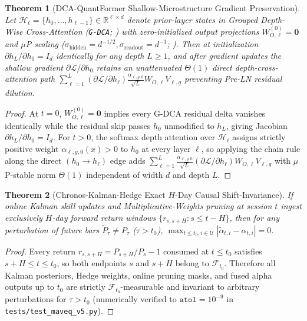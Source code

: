 \documentclass[11pt]{article}
\newtheorem{theorem}{Theorem}
\begin{document}
\begin{theorem}[DCA-QuantFormer Shallow-Microstructure Gradient Preservation]
\label{thm:dca_grad}
Let $\mathcal{H}_\ell = \{h_0, \dots, h_{\ell-1}\} \in \mathbb{R}^{\ell \times d}$ denote prior-layer states in Grouped Depth-Wise Cross-Attention (\texttt{G-DCA}; \citealt{heddes2025dca}) with zero-initialized output projections $W_{O,\ell}^{(0)} = \mathbf{0}$ and $\mu$P scaling ($\sigma_{\text{hidden}} = d^{-1/2}, \sigma_{\text{readout}} = d^{-1}$; \citealt{yang2022mup}). Then at initialization $\partial h_L / \partial h_0 = I_d$ identically for any depth $L \ge 1$, and after gradient updates the shallow gradient $\partial \mathcal{L} / \partial h_0$ retains an unattenuated $\Theta(1)$ direct depth-cross-attention path $\sum_{\ell=1}^L (\partial \mathcal{L}/\partial h_\ell)\frac{\alpha_{\ell,g,0}}{\sqrt{L}} W_{O,\ell} V_{\ell,g}$ preventing Pre-LN residual dilution.
\end{theorem}
\begin{proof}
At $t=0$, $W_{O,\ell}^{(0)} = \mathbf{0}$ implies every G-DCA residual delta vanishes identically while the residual skip passes $h_0$ unmodified to $h_L$, giving Jacobian $\partial h_L / \partial h_0 = I_d$. For $t>0$, the softmax depth attention over $\mathcal{H}_\ell$ assigns strictly positive weight $\alpha_{\ell,g,0}(x) > 0$ to $h_0$ at every layer $\ell$, so applying the chain rule along the direct $(h_0 \to h_\ell)$ edge adds $\sum_{\ell=1}^L \frac{\alpha_{\ell,g,0}}{\sqrt{L}} (\partial \mathcal{L}/\partial h_\ell) W_{O,\ell} V_{\ell,g}$ with $\mu$P-stable norm $\Theta(1)$ independent of width $d$ and depth $L$.
\end{proof}

\begin{theorem}[Chronos-Kalman-Hedge Exact $H$-Day Causal Shift-Invariance]
\label{thm:chronos_causal}
If online Kalman skill updates and Multiplicative-Weights pruning at session $t$ ingest exclusively $H$-day forward return windows $\{r_{s,s+H} : s \le t - H\}$, then for any perturbation of future bars $\tilde{P}_\tau \neq P_\tau$ ($\tau > t_0$), $\max_{t \le t_0, i \in \mathcal{U}} |\tilde{\alpha}_{t,i} - \alpha_{t,i}| = 0$.
\end{theorem}
\begin{proof}
Every return $r_{s,s+H} = P_{s+H}/P_s - 1$ consumed at $t \le t_0$ satisfies $s + H \le t \le t_0$, so both endpoints $s$ and $s+H$ belong to $\mathcal{F}_{t_0}$. Therefore all Kalman posteriors, Hedge weights, online pruning masks, and fused alpha outputs up to $t_0$ are strictly $\mathcal{F}_{t_0}$-measurable and invariant to arbitrary perturbations for $\tau > t_0$ (numerically verified to $\texttt{atol}=10^{-9}$ in \texttt{tests/test\_maveq\_v5.py}).
\end{proof}
\end{document}
